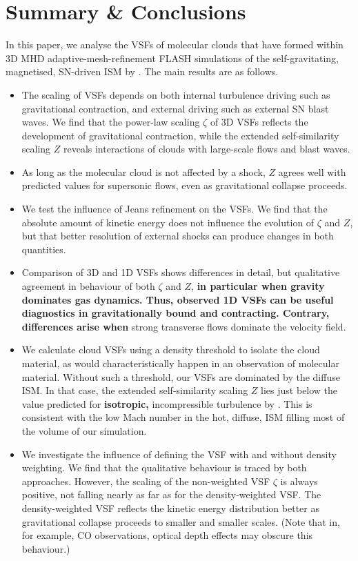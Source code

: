\section{Summary \& Conclusions}\label{conclusions}

In this paper, we analyse the VSFs of molecular clouds that have formed within 3D MHD adaptive-mesh-refinement FLASH simulations of the self-gravitating, magnetised, SN-driven ISM by .
The main results are as follows.

\begin{itemize}
	\item The scaling of VSFs depends on both internal turbulence driving such as gravitational contraction, and external driving such as external SN blast waves. We find that the power-law scaling $\zeta$ of 3D VSFs reflects the development of gravitational contraction, while the extended self-similarity scaling $Z$ reveals interactions of clouds with large-scale flows and blast waves.
	\item As long as the molecular cloud is not affected by a shock, $Z$ agrees well with predicted values for supersonic flows, even as gravitational collapse proceeds.
	\item We test the influence of Jeans refinement on the VSFs. We find that the absolute amount of kinetic energy does not influence the evolution of $\zeta$ and $Z$, but that better resolution of external shocks can produce changes in both quantities.
	\item Comparison of 3D and 1D VSFs shows differences in detail, but qualitative agreement in behaviour of both $\zeta$ and $Z$, \textbf{in particular when gravity dominates gas dynamics. Thus, observed 1D VSFs can be useful diagnostics in gravitationally bound and contracting. Contrary, differences arise when} strong transverse flows dominate the velocity field. 
	\item We calculate cloud VSFs using a density threshold to isolate the cloud material, as would characteristically happen in an observation of molecular material. Without such a threshold, our VSFs are dominated by the diffuse ISM. In that case, the extended self-similarity scaling $Z$ lies just below the value predicted for \textbf{isotropic,} incompressible turbulence by \citet{She1994}. This is consistent with the low Mach number in the hot, diffuse, ISM filling most of the volume of our simulation.
	\item We investigate the influence of defining the VSF with and without density weighting. We find that the qualitative behaviour is traced by both approaches. However, the scaling of the non-weighted VSF $\zeta$ is always positive, not falling nearly as far as for the density-weighted VSF. The density-weighted VSF reflects the kinetic energy distribution better as gravitational collapse proceeds to smaller and smaller scales. (Note that in, for example, CO observations, optical depth effects may obscure this behaviour.) 

\end{itemize}
